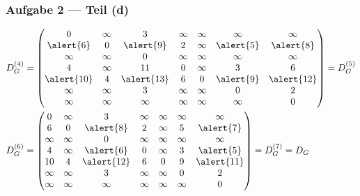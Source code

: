 \documentclass{beamer}
\begin{document}
\begin{frame} \frametitle{Aufgabe 2 --- Teil (d)}
	\small
	\begin{equation*}
	\begin{aligned}
		D_G^{(4)} &= \begin{pmatrix}
		0      & \infty & 3      & \infty & \infty & \infty & \infty \\
		\alert{6}      & 0      & \alert{9}     & 2      & \infty & \alert{5} & \alert{8} \\
		\infty & \infty & 0      & \infty & \infty & \infty & \infty \\
		4      & \infty & 11     & 0      & \infty & 3      & 6      \\
		\alert{10}     & 4      & \alert{13}     & 6      & 0      & \alert{9} & \alert{12}     \\
		\infty & \infty & 3      & \infty & \infty & 0      & 2      \\
		\infty & \infty & \infty & \infty & \infty & \infty & 0
		\end{pmatrix}
		= D_G^{(5)} \\
		D_G^{(6)} &= \begin{pmatrix}
		0          & \infty & 3          & \infty & \infty & \infty & \infty \\
		6          & 0      & \alert{8}  & 2      & \infty & 5      & \alert{7} \\
		\infty     & \infty & 0          & \infty & \infty & \infty & \infty \\
		4          & \infty & \alert{6}  & 0      & \infty & 3      & \alert{5}     \\
		10         & 4      & \alert{12} & 6      & 0      & 9      & \alert{11}     \\
		\infty     & \infty & 3          & \infty & \infty & 0      & 2      \\
		\infty     & \infty & \infty     & \infty & \infty & \infty & 0
		\end{pmatrix}
		= D_G^{(7)} = D_G
	\end{aligned}
	\end{equation*}
\end{frame}
\end{document}
